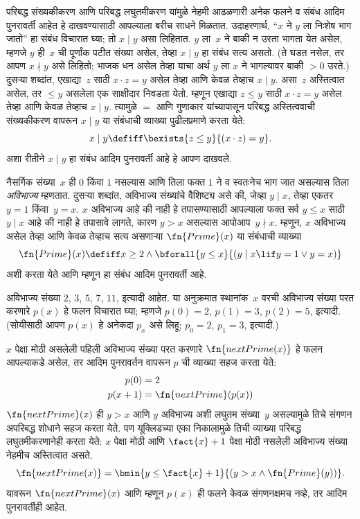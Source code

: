 परिबद्ध संख्यकीकरण आणि परिबद्ध लघुतमीकरण यांमुळे नेहमी आढळणारी अनेक
फलने व संबंध आदिम पुनरावर्ती आहेत हे दाखवण्यासाठी आपल्याला बरीच साधने
मिळतात. उदाहरणार्थ, ``$x$ ने $y$ ला निःशेष भाग जातो'' हा संबंध विचारात
घ्या; तो $x \mid y$ असा लिहितात. $y$ ला~$x$ ने बाकी न उरता भागता येत
असेल, म्हणजे $y$ ही~$x$ ची पूर्णांक पटीत संख्या असेल, तेव्हा $x \mid y$
हा संबंध सत्य असतो. (ते घडत नसेल, तर आपण $x \nmid y$ असे लिहितो;
भाजक धन असेल तेव्हा याचा अर्थ $y$ ला $x$ ने भागल्यावर बाकी $> 0$ उरते.)
दुसऱ्या शब्दांत, एखाद्या~$z$ साठी $x \cdot z = y$ असेल तेव्हा आणि केवळ
तेव्हाच $x \mid y$. असा~$z$ अस्तित्वात असेल, तर $\leq y$ असलेला एक
साक्षीदार निवडता येतो. म्हणून एखाद्या $z \le y$ साठी $x \cdot z = y$
असेल तेव्हा आणि केवळ तेव्हाच $x \mid y$. त्यामुळे $=$ आणि गुणाकार
यांच्यापासून परिबद्ध अस्तित्ववाची संख्यकीकरण वापरून $x \mid y$ या संबंधाची
व्याख्या पुढीलप्रमाणे करता येते:
\[x \mid y \defiff \bexists{z \leq y}{(x \cdot z) = y}.
\]
अशा रीतीने $x \mid y$ हा संबंध आदिम पुनरावर्ती आहे हे आपण दाखवले.

नैसर्गिक संख्या~$x$ ही $0$ किंवा $1$ नसल्यास आणि तिला फक्त $1$ ने व
स्वतःनेच भाग जात असल्यास तिला \emph{अविभाज्य} म्हणतात. दुसऱ्या शब्दांत,
अविभाज्य संख्यांचे वैशिष्ट्य असे की, जेव्हा $y \mid x$, तेव्हा एकतर
$y = 1$ किंवा~$y=x$. $x$ अविभाज्य आहे की नाही हे तपासण्यासाठी आपल्याला
फक्त सर्व $y \le x$ साठी $y \mid x$ आहे की नाही हे तपासावे लागते, कारण
$y > x$ असल्यास आपोआप~$y \nmid x$. म्हणून, $x$ अविभाज्य असेल तेव्हा आणि
केवळ तेव्हाच सत्य असणाऱ्या $\fn{Prime}(x)$ या संबंधाची व्याख्या
\[\fn{Prime}(x) \defiff x \geq 2 \land \bforall{y \leq x}{(y \mid x \lif y
  = 1 \lor y = x)}
\]
अशी करता येते आणि म्हणून हा संबंध आदिम पुनरावर्ती आहे.

अविभाज्य संख्या $2$, $3$, $5$, $7$, $11$, इत्यादी आहेत. या अनुक्रमात
स्थानांक~$x$ वरची अविभाज्य संख्या परत करणारे $p(x)$ हे फलन विचारात घ्या;
म्हणजे $p(0) = 2$, $p(1) = 3$, $p(2) = 5$, इत्यादी. (सोयीसाठी आपण
$p(x)$ हे अनेकदा $p_x$ असे लिहू; $p_0=2$, $p_1=3$, इत्यादी.)

$x$ पेक्षा मोठी असलेली पहिली अविभाज्य संख्या परत करणारे
$\fn{nextPrime(x)}$ हे फलन आपल्याकडे असेल, तर आदिम पुनरावर्तन वापरून
$p$ ची व्याख्या सहज करता येते:
\begin{align*}
  p(0) & = 2\\
  p(x+1) & = \fn{nextPrime}(p(x))
\end{align*}
$\fn{nextPrime}(x)$ ही $y > x$ आणि $y$ अविभाज्य अशी लघुतम संख्या~$y$ असल्यामुळे
तिचे संगणन अपरिबद्ध शोधाने सहज करता येते. पण यूक्लिडच्या एका निकालामुळे
तिची व्याख्या परिबद्ध लघुतमीकरणानेही करता येते: $x$ पेक्षा मोठी आणि
$\fact{x}+1$ पेक्षा मोठी नसलेली अविभाज्य संख्या नेहमीच अस्तित्वात असते.
\[  \fn{nextPrime(x)} =
  \bmin{y \leq \fact{x}+1}{(y > x \land \fn{Prime}(y))}.
\]
यावरून $\fn{nextPrime}(x)$ आणि म्हणून $p(x)$ ही फलने केवळ संगणनक्षमच नव्हे,
तर आदिम पुनरावर्तीही आहेत.

